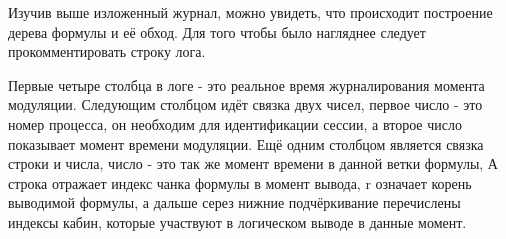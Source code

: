 Изучив выше изложенный журнал, можно увидеть, что происходит построение дерева формулы и её обход.
	Для того чтобы было нагляднее следует прокомментировать строку лога.

Первые четыре столбца в логе - это реальное время журналирования момента модуляции.
	Следующим столбцом идёт связка двух чисел, первое число - это номер процесса,
	он необходим для идентификации сессии, а второе число показывает момент времени модуляции.
	Ещё одним столбцом является связка строки и числа, число - это так же момент времени в данной ветки формулы,
	А строка отражает индекс чанка формулы в момент вывода, r означает корень выводимой формулы, а дальше серез нижние подчёркивание перечислены индексы кабин, которые участвуют в логическом выводе в данные момент.
